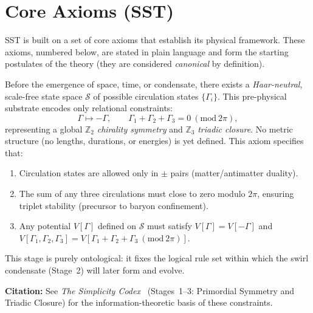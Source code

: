 \documentclass[10pt,reprint,aps,onecolumn,nofootinbib]{revtex4-2}
\begin{document}
    \section{Core Axioms (SST)}
    SST is built on a set of core axioms that establish its physical framework. These axioms, numbered below, are stated in plain language and form the starting postulates of the theory (they are considered \emph{canonical} by definition).
    \begin{tcolorbox}[title=Axiom 0: Logical Substrate (Pre-Swirl Potential)]
        Before the emergence of space, time, or condensate, there exists a
        \emph{Haar-neutral}, scale-free state space $\mathcal{S}$ of possible circulation states
        $\{\Gamma_i\}$. This pre-physical substrate encodes only relational constraints:
        \[
            \Gamma \mapsto -\Gamma,
            \qquad
            \Gamma_1 + \Gamma_2 + \Gamma_3 = 0 \ (\mathrm{mod}\ 2\pi),
        \]
        representing a global $\mathbb{Z}_2$ \emph{chirality symmetry} and
        $\mathbb{Z}_3$ \emph{triadic closure}.
        No metric structure (no lengths, durations, or energies) is yet defined.
        This axiom specifies that:
        \begin{enumerate}
            \item Circulation states are allowed only in $\pm$ pairs (matter/antimatter duality).
            \item The sum of any three circulations must close to zero modulo $2\pi$, ensuring
            triplet stability (precursor to baryon confinement).
            \item Any potential $V[\Gamma]$ defined on $\mathcal{S}$ must satisfy
            $V[\Gamma]=V[-\Gamma]$ and $V[\Gamma_1,\Gamma_2,\Gamma_3] =
            V[\Gamma_1+\Gamma_2+\Gamma_3\ (\mathrm{mod}\ 2\pi)]$.
        \end{enumerate}
        This stage is purely ontological: it fixes the logical rule set within which the
        swirl condensate (Stage~2) will later form and evolve.
    \end{tcolorbox}

    \noindent\textbf{Citation:}
    See \emph{The Simplicity Codex}~\cite{Goldau2025_STC} (Stages~1--3: Primordial Symmetry
    and Triadic Closure) for the information-theoretic basis of these constraints.
\end{document}
